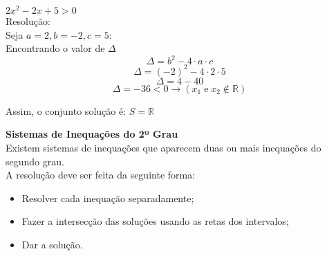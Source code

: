 \begin{tasks}
		\task $2x^2 - 2x +5 > 0$\\
		Resolução:\\
		Seja $a=2, b=-2, c=5$:\\
		Encontrando o valor de $\Delta$
		\[
		\Delta = b^2 - 4 \cdot a \cdot c
		\]
		\[
		\Delta = (-2)^2 - 4 \cdot 2 \cdot 5
		\]
		\[
		\Delta = 4 - 40
		\]
		\[
		\Delta = -36 < 0 \longrightarrow (x_1\; \text{e}\; x_2 \notin \mathbb{R} )
		\]
        \begin{center}
    \end{center}
            
		Assim, o conjunto solução é: $  S= \mathbb{R}$
	\end{tasks}
 
	\noindent
	\textbf{Sistemas de Inequações do 2º Grau}\\
	Existem sistemas de inequações que aparecem duas ou mais inequações do segundo grau.\\
	
	A resolução deve ser feita da seguinte forma:
	\begin{itemize}
		\item Resolver cada inequação separadamente;
		\item Fazer a intersecção das soluções usando as retas dos intervalos;
		\item Dar a solução.
	\end{itemize}

